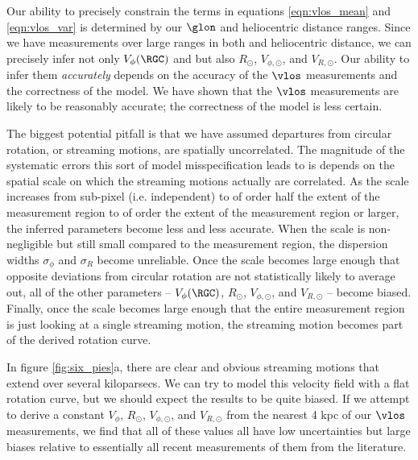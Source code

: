 Our ability to precisely constrain the terms in equations \ref{eqn:vlos_mean} and \ref{eqn:vlos_var} is determined by our $\glon$ and heliocentric distance ranges. 
Since we have measurements over large ranges in both \glon and heliocentric distance, we can precisely infer not only $V_\phi(\RGC)$ and but also $R_\odot$, $V_{\phi, \odot}$, and $V_{R, \odot}$. 
Our ability to infer them \emph{accurately} depends on the accuracy of the $\vlos$ measurements and the correctness of the model.
We have shown that the $\vlos$ measurements are likely to be reasonably accurate; the correctness of the model is less certain.

The biggest potential pitfall is that we have assumed departures from circular rotation, or streaming motions, are spatially uncorrelated.
The magnitude of the systematic errors this sort of model misspecification leads to is depends on the spatial scale on which the streaming motions actually are correlated.
As the scale increases from sub-pixel (i.e. independent) to of order half the extent of the measurement region to of order the extent of the measurement region or larger, the inferred parameters become less and less accurate. 
When the scale is non-negligible but still small compared to the measurement region, the dispersion widths $\sigma_\phi$ and $\sigma_R$ become unreliable.
Once the scale becomes large enough that opposite deviations from circular rotation are not statistically likely to average out, all of the other parameters -- $V_\phi(\RGC)$, $R_\odot$, $V_{\phi, \odot}$, and $V_{R, \odot}$ -- become biased.
Finally, once the scale becomes large enough that the entire measurement region is just looking at a single streaming motion, the streaming motion becomes part of the derived rotation curve.

In figure \ref{fig:six_pies}a, there are clear and obvious streaming motions that extend over several kiloparsecs. 
We can try to model this velocity field with a flat rotation curve, but we should expect the results to be quite biased.
If we attempt to derive a constant $V_\phi$, $R_\odot$, $V_{\phi, \odot}$, and $V_{R,\odot}$ from the  nearest 4 kpc of our $\vlos$ measurements, we find that all of these values all have low uncertainties but large biases relative to essentially all recent measurements of them from the literature.



